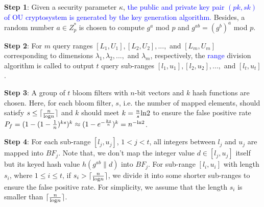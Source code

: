 \documentclass[IEEE JOURNAL OF BIOMEDICAL AND HEALTH INFORMATICS]{IEEEtran}
\begin{document}
{\textbf{Step 1}: Given a security parameter $\kappa$, \textcolor{blue}{the public and private key pair $(pk, sk)$ of OU cryptosystem is generated by the key generation algorithm.} Besides, a random number $a\in Z_p^*$ is chosen to compute $g^a$ mod $p$ and $g^{ab}=(g^b)^a$ mod $p$.
	
\textbf{Step 2}: For $m$ query ranges $[L_1, U_1], [L_2, U_2], ... ,$ and $[L_m, U_m]$ corresponding to dimensions $\lambda_1, \lambda_2, ...,$ and $\lambda_m$, respectively, the \textcolor{blue}{range} division algorithm is called to output $t$ query sub-ranges $[l_1, u_1], [l_2, u_2], ... ,$ and $[l_t, u_t]$.

\textbf{Step 3}: A group of $t$ bloom filters with $n$-bit vectors and $k$ hash functions are chosen. Here, for each bloom filter, $s$, i.e. the number of mapped elements, should satisfy $s \le \lceil \frac{n}{{\rm log}n} \rceil $ and $k$ should meet $k=\frac{n}{s}{\rm ln}2$ to ensure the false positive rate $P_f=(1-(1-\frac{1}{n})^{ks})^k \approx (1-e^{-\frac{ks}{n}})^k  =n^{-{\rm ln}2}$.

\textbf{Step 4}: For each sub-range $[l_j, u_j]$, $1<$$j$$<t$, all integers between $l_j$ and $u_j$ are mapped into $BF_j$. Note that, we don't map the integer value $d\in [l_j, u_j]$ itself but its keyed hash value $h(g^{ab}\|d)$ into $BF_j$. For sub-range $[l_i, u_i]$ with length $s_i$, where $1 \le i \le t$, if $s_i  >\lceil \frac{n}{{\rm log} n} \rceil$, we divide it into some shorter sub-ranges to ensure the false positive rate. For simplicity, we assume that the length $s_i$ is smaller than $\lceil \frac{n}{{\rm log} n} \rceil$.

}
\end{document}

